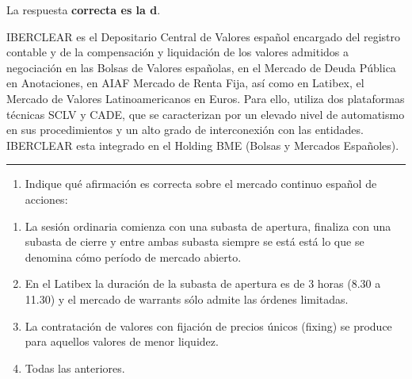 \documentclass[
  letterpaper,
  DIV=11,
  numbers=noendperiod]{scrreprt}
\providecommand{\tightlist}{%
  \setlength{\itemsep}{0pt}\setlength{\parskip}{0pt}}\usepackage{longtable,booktabs,array}
\begin{document}
\begin{tcolorbox}[enhanced jigsaw, left=2mm, opacityback=0, colback=white, breakable, arc=.35mm, bottomrule=.15mm, rightrule=.15mm, toprule=.15mm, leftrule=.75mm, colframe=quarto-callout-tip-color-frame]
\begin{minipage}[t]{5.5mm}
\textcolor{quarto-callout-tip-color}{\faLightbulb}
\end{minipage}%
\begin{minipage}[t]{\textwidth - 5.5mm}

La respuesta \textbf{correcta es la d}.

IBERCLEAR es el Depositario Central de Valores español encargado del
registro contable y de la compensación y liquidación de los valores
admitidos a negociación en las Bolsas de Valores españolas, en el
Mercado de Deuda Pública en Anotaciones, en AIAF Mercado de Renta Fija,
así como en Latibex, el Mercado de Valores Latinoamericanos en Euros.
Para ello, utiliza dos plataformas técnicas SCLV y CADE, que se
caracterizan por un elevado nivel de automatismo en sus procedimientos y
un alto grado de interconexión con las entidades. IBERCLEAR esta
integrado en el Holding BME (Bolsas y Mercados Españoles).

\end{minipage}%
\end{tcolorbox}

\begin{center}\rule{0.5\linewidth}{0.5pt}\end{center}

\begin{enumerate}
\def\labelenumi{\arabic{enumi}.}
\setcounter{enumi}{13}
\tightlist
\item
  Indique qué afirmación es correcta sobre el mercado continuo español
  de acciones:
\end{enumerate}

\begin{enumerate}
\def\labelenumi{\alph{enumi})}
\item
  La sesión ordinaria comienza con una subasta de apertura, finaliza con
  una subasta de cierre y entre ambas subasta siempre se está está lo
  que se denomina cómo período de mercado abierto.
\item
  En el Latibex la duración de la subasta de apertura es de 3 horas
  (8.30 a 11.30) y el mercado de warrants sólo admite las órdenes
  limitadas.
\item
  La contratación de valores con fijación de precios únicos (fixing) se
  produce para aquellos valores de menor liquidez.
\item
  Todas las anteriores.
\end{enumerate}
\end{document}
